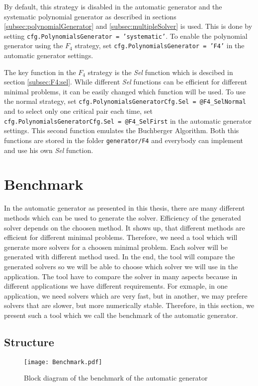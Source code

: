 By default, this strategy is disabled in the automatic generator and the systematic polynomial generator as described in sections \ref{subsec:polynomialGenerator} and \ref{subsec:multipleSolver} is used. This is done by setting \texttt{cfg.PolynomialsGenerator = 'systematic'}. To enable the polynomial generator using the $F_4$ strategy, set \texttt{cfg.PolynomialsGenerator = 'F4'} in the automatic generator settings.

The key function in the $F_4$ strategy is the \textit{Sel} function which is descibed in section \ref{subsec:F4:sel}. While different \textit{Sel} functions can be efficient for different minimal problems, it can be easily changed which function will be used. To use the normal strategy, set \texttt{cfg.PolynomialsGeneratorCfg.Sel = @F4\_SelNormal} and to select only one critical pair each time, set \texttt{cfg.PolynomialsGeneratorCfg.Sel = @F4\_SelFirst} in the automatic generator settings. This second function emulates the Buchberger Algorithm. Both this functions are stored in the folder \texttt{generator/F4} and everybody can implement and use his own \textit{Sel} function.

\section{Benchmark}
In the automatic generator as presented in this thesis, there are many different methods which can be used to generate the solver. Efficiency of the generated solver depends on the choosen method. It shows up, that different methods are efficient for different minimal problems. Therefore, we need a tool which will generate more solvers for a choosen minimal problem. Each solver will be generated with different method used. In the end, the tool will compare the generated solvers so we will be able to choose which solver we will use in the application. The tool have to compare the solver in many aspects because in different applications we have different requirements. For exmaple, in one application, we need solvers which are very fast, but in another, we may prefere solvers that are slower, but more numerically stable. Therefore, in this section, we present such a tool which we call the benchmark of the automatic generator.

\subsection{Structure}

\begin{figure}[ht]
  \centering
  \texttt{[image: Benchmark.pdf]}
  \caption{Block diagram of the benchmark of the automatic generator}
  \label{autogen:benchmark}
\end{figure}

